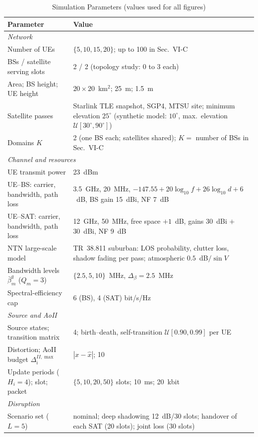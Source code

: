 \begin{table}[t]
\centering
\caption{Simulation Parameters (values used for all figures)}
\label{tab:simulation_parameters}
\renewcommand{\arraystretch}{1.15}
\begin{tabular}{p{} p{}}
\hline
\textbf{Parameter} & \textbf{Value} \\
\hline
\multicolumn{2}{l}{\emph{Network}} \\
Number of UEs & $\{5,10,15,20\}$; up to 100 in Sec.~VI-C \\
BSs / satellite serving slots & 2 / 2 (topology study: 0 to 3 each) \\
Area; BS height; UE height & $20\times20$~km$^2$; 25~m; 1.5~m \\
Satellite passes & Starlink TLE snapshot, SGP4, MTSU site; minimum elevation $25^\circ$ (synthetic model: $10^\circ$, max.\ elevation $\mathcal{U}[30^\circ,90^\circ]$) \\
Domains $K$ & 2 (one BS each; satellites shared); $K=$ number of BSs in Sec.~VI-C \\
\hline
\multicolumn{2}{l}{\emph{Channel and resources}} \\
UE transmit power & 23~dBm \\
UE--BS: carrier, bandwidth, path loss & 3.5~GHz, 20~MHz, $-147.55+20\log_{10}f+26\log_{10}d+6$~dB, BS gain 15~dBi, NF 7~dB \\
UE--SAT: carrier, bandwidth, path loss & 12~GHz, 50~MHz, free space $+1$~dB, gains 30~dBi $+$ 30~dBi, NF 9~dB \\
NTN large-scale model & TR~38.811 suburban: LOS probability, clutter loss, shadow fading per pass; atmospheric $0.5$~dB$/\sin V$ \\
Bandwidth levels $\bar\beta^q_m$ ($Q_m=3$) & $\{2.5,5,10\}$~MHz, $\Delta_\beta=2.5$~MHz \\
Spectral-efficiency cap & 6 (BS), 4 (SAT) bit/s/Hz \\
\hline
\multicolumn{2}{l}{\emph{Source and AoII}} \\
Source states; transition matrix & 4; birth--death, self-transition $\mathcal{U}[0.90,0.99]$ per UE \\
Distortion; AoII budget $\Delta^{II,\max}_i$ & $|x-\hat x|$; 10 \\
Update periods ($H_i=4$); slot; packet & $\{5,10,20,50\}$ slots; 10~ms; 20~kbit \\
\hline
\multicolumn{2}{l}{\emph{Disruption}} \\
Scenario set ($L=5$) & nominal; deep shadowing 12~dB/30 slots; handover of each SAT (20 slots); joint loss (30 slots) \\

\end{tabular}
\end{table}
